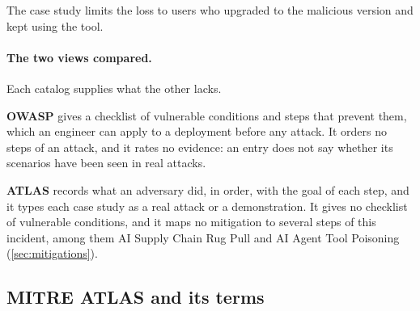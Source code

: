 The case study limits the loss to users who upgraded to the malicious version and kept using the
tool.

\paragraph{The two views compared.} Each catalog supplies what the other lacks.
\bi
\item \textbf{OWASP} gives a checklist of vulnerable conditions and steps that prevent them, which an
engineer can apply to a deployment before any attack. It orders no steps of an attack, and it rates
no evidence: an entry does not say whether its scenarios have been seen in real attacks.
\item \textbf{ATLAS} records what an adversary did, in order, with the goal of each step, and it
types each case study as a real attack or a demonstration. It gives no checklist of vulnerable
conditions, and it maps no mitigation to several steps of this incident, among them AI Supply
Chain Rug Pull and AI Agent Tool Poisoning (\cref{sec:mitigations}).
\ei

\subsection{MITRE ATLAS and its terms}
\label{sec:threats-atlas}

